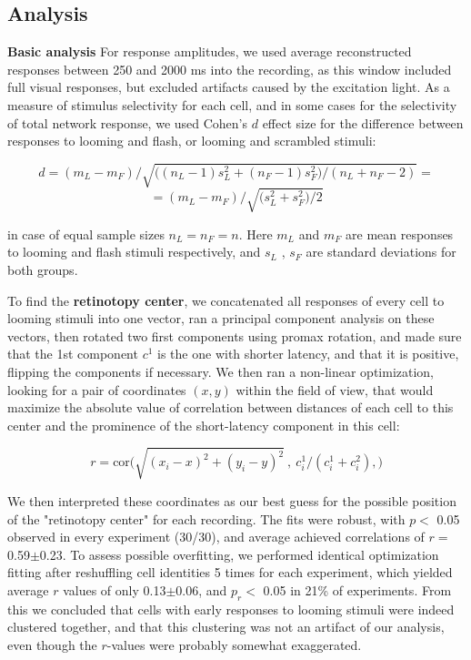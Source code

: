 \documentclass{article}
\begin{document}
\subsection*{Analysis}

\textbf{Basic analysis} For response amplitudes, we used average reconstructed responses between 250 and 2000 ms into the recording, as this window included full visual responses, but excluded artifacts caused by the excitation light. As a measure of stimulus selectivity for each cell, and in some cases for the selectivity of total network response, we used Cohen’s $d$ effect size for the difference between responses to looming and flash, or looming and scrambled stimuli:

\[ d = (m_L-m_F)/ \sqrt{ \big((n_L-1) s^2_L + (n_F-1) s^2_F)/(n_L + n_F - 2)} = \]
\[ =(m_L-m_F)/\sqrt{\big(s^2_L+s^2_F\big)/2} \]

in case of equal sample sizes $n_L=n_F=n$. Here $m_L$ and $m_F$ are mean responses to looming and flash stimuli respectively, and $s_L$ , $s_F$ are standard deviations for both groups.

To find the \textbf{retinotopy center}, we concatenated all responses of every cell to looming stimuli into one vector, ran a principal component analysis on these vectors, then rotated two first components using promax rotation, and made sure that the 1st component $c^1$ is the one with shorter latency, and that it is positive, flipping the components if necessary. We then ran a non-linear optimization, looking for a pair of coordinates $(x,y)$ within the field of view, that would maximize the absolute value of correlation between distances of each cell to this center and the prominence of the short-latency component in this cell:

\[ r = \text{cor}\big(\sqrt{(x_i-x)^2+(y_i-y)^2}\ ,\ c^1_i/(c^1_i + c^2_i), \big) \]

We then interpreted these coordinates as our best guess for the possible position of the "retinotopy center" for each recording. The fits were robust, with $p<$ 0.05 observed in every experiment (30/30), and average achieved correlations of $r=$ 0.59$\pm$0.23. To assess possible overfitting, we performed identical optimization fitting  after reshuffling cell identities 5 times for each experiment, which yielded average $r$ values of only 0.13$\pm$0.06, and $p_r<$ 0.05 in 21\% of experiments. From this we concluded that cells with early responses to looming stimuli were indeed clustered together, and that this clustering was not an artifact of our analysis, even though the $r$-values were probably somewhat exaggerated.
\end{document}
